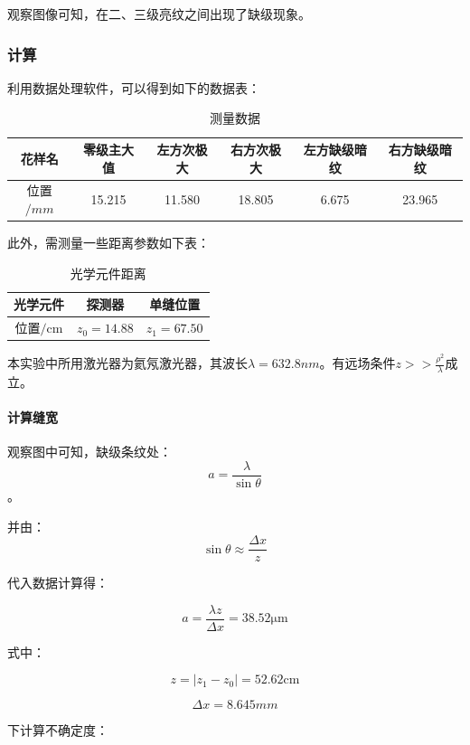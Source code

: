 \documentclass{ctexart}
\begin{document}
观察图像可知，在二、三级亮纹之间出现了缺级现象。


\subsubsection{计算}
利用数据处理软件，可以得到如下的数据表：
\begin{table}[H]
  \centering
  \caption{测量数据}
    \begin{tabular}{|c|c|c|c|c|c|}\hline
    花样名   & {零级主大值} & {左方次极大} & {右方次极大} & {左方缺级暗纹} & {右方缺级暗纹} \\\hline
    位置$/\si{mm}$ & 15.215 & 11.580 & 18.805 & 6.675 & 23.965 \\\hline
    \end{tabular}%
  \label{tab:addlabel}%
\end{table}%

 此外，需测量一些距离参数如下表：
\begin{table}[htbp]
  \centering
  \caption{光学元件距离}
    \begin{tabular}{|c|c|c|}\hline
    光学元件  & {探测器} & {单缝位置} \\ \hline
    位置$/\si{\centi\meter}$ & $z_0=14.88$ & $z_1=67.50$ \\\hline
    \end{tabular}%
  \label{tab:addlabel}%
\end{table}%



本实验中所用激光器为氦氖激光器，其波长$\lambda=632.8\si{nm}$。有远场条件$z>>\frac{\rho^2}{\lambda}$成立。

\paragraph{计算缝宽}

观察图中可知，缺级条纹处：$$a=\frac{\lambda}{\sin{\theta}}$$。

并由：
$$\sin{\theta}\approx \frac{\Delta x}{z}$$

代入数据计算得：

$$a=\frac{\lambda z}{\Delta x}=38.52\si{\micro \meter}$$

式中：

$$ z=|z_1-z_0|=52.62\si{\centi \meter}$$

$$ \Delta x=8.645\si{mm}$$

下计算不确定度：
\end{document}
